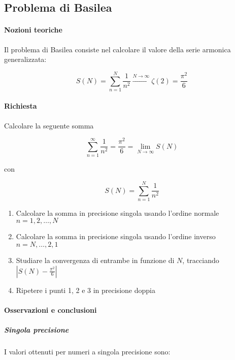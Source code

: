 
\subsection{Problema di Basilea}

\paragraph{Nozioni teoriche}

Il problema di Basilea consiste nel calcolare il valore della serie armonica generalizzata:

$$
	S(N) = \sum_{n=1}^{N} \frac{1}{n^2} \xrightarrow{N \to \infty} \zeta(2) = \frac{\pi^2}{6}
$$

\paragraph{Richiesta} 

Calcolare la seguente somma

\[
\sum_{n=1}^{\infty} \frac{1}{n^2} = \frac{\pi^2}{6} = \lim_{N \to \infty} S(N)
\]

con

\[
S(N) = \sum_{n=1}^{N} \frac{1}{n^2}
\]

\begin{enumerate}
    \item Calcolare la somma in precisione singola usando l'ordine normale \( n = 1, 2, \dots, N \)
    \item Calcolare la somma in precisione singola usando l'ordine inverso \( n = N, \dots, 2, 1 \)
    \item Studiare la convergenza di entrambe in funzione di \( N \), tracciando \( \left| S(N) - \frac{\pi^2}{6} \right| \)
    \item Ripetere i punti 1, 2 e 3 in precisione doppia
\end{enumerate}


\paragraph{Osservazioni e conclusioni}

\subparagraph{Singola precisione}

I valori ottenuti per numeri a singola precisione sono:


